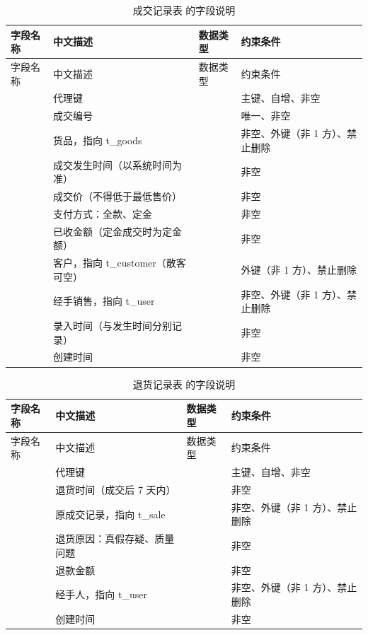 \begin{longtable}{@{}L{3.5cm} L{4.1cm} L{2.9cm} L{4.0cm}@{}}
\caption{成交记录表  的字段说明}\label{tab:f-t-sale}\\
\toprule
字段名称 & 中文描述 & 数据类型 & 约束条件 \\
\midrule
\endfirsthead
\toprule
字段名称 & 中文描述 & 数据类型 & 约束条件 \\
\midrule
\endhead
\bottomrule
\endlastfoot
{} & 代理键 &  & 主键、自增、非空 \\
 & 成交编号 &  & 唯一、非空 \\
 & 货品，指向 t\_goods &  & 非空、外键（非 1 方）、禁止删除 \\
 & 成交发生时间（以系统时间为准） &  & 非空 \\
 & 成交价（不得低于最低售价） &  & 非空 \\
 & 支付方式：全款、定金 &  & 非空 \\
 & 已收金额（定金成交时为定金额） &  & 非空 \\
 & 客户，指向 t\_customer（散客可空） &  & 外键（非 1 方）、禁止删除 \\
 & 经手销售，指向 t\_user &  & 非空、外键（非 1 方）、禁止删除 \\
 & 录入时间（与发生时间分别记录） &  & 非空 \\
 & 创建时间 &  & 非空 \\
\end{longtable}

\begin{longtable}{@{}L{3.5cm} L{4.1cm} L{2.9cm} L{4.0cm}@{}}
\caption{退货记录表  的字段说明}\label{tab:f-t-return}\\
\toprule
字段名称 & 中文描述 & 数据类型 & 约束条件 \\
\midrule
\endfirsthead
\toprule
字段名称 & 中文描述 & 数据类型 & 约束条件 \\
\midrule
\endhead
\bottomrule
\endlastfoot
{} & 代理键 &  & 主键、自增、非空 \\
 & 退货时间（成交后 7 天内） &  & 非空 \\
 & 原成交记录，指向 t\_sale &  & 非空、外键（非 1 方）、禁止删除 \\
 & 退货原因：真假存疑、质量问题 &  & 非空 \\
 & 退款金额 &  & 非空 \\
 & 经手人，指向 t\_user &  & 非空、外键（非 1 方）、禁止删除 \\
 & 创建时间 &  & 非空 \\
\end{longtable}

